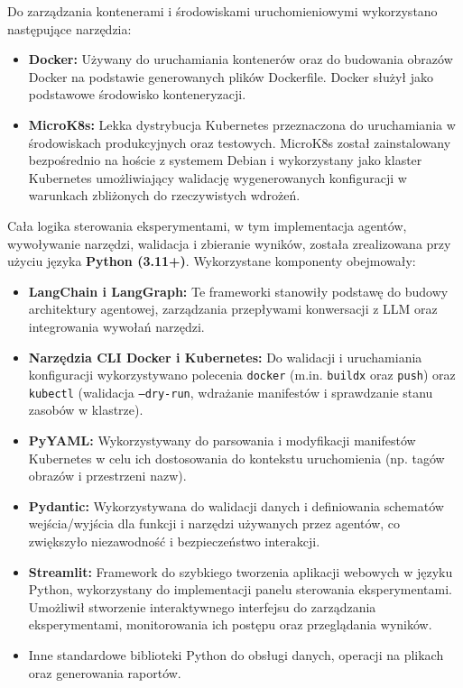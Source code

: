 Do zarządzania kontenerami i środowiskami uruchomieniowymi wykorzystano następujące narzędzia:
\begin{itemize}
	\item \textbf{Docker:} \cite{merkel_docker_nodate} Używany do uruchamiania kontenerów oraz do budowania obrazów Docker na podstawie generowanych plików Dockerfile. Docker służył jako podstawowe środowisko konteneryzacji.
	\item \textbf{MicroK8s:} \cite{microk8s} Lekka dystrybucja Kubernetes przeznaczona do uruchamiania w środowiskach produkcyjnych oraz testowych. MicroK8s został zainstalowany bezpośrednio na hoście z systemem Debian i wykorzystany jako klaster Kubernetes umożliwiający walidację wygenerowanych konfiguracji w warunkach zbliżonych do rzeczywistych wdrożeń.
\end{itemize}

Cała logika sterowania eksperymentami, w tym implementacja agentów, wywoływanie narzędzi, walidacja i zbieranie wyników, została zrealizowana przy użyciu języka \textbf{Python (3.11+)}. Wykorzystane komponenty obejmowały:
\begin{itemize}
    \item \textbf{LangChain i LangGraph:} \cite{langchain} \cite{langgraph} Te frameworki stanowiły podstawę do budowy architektury agentowej, zarządzania przepływami konwersacji z LLM oraz integrowania wywołań narzędzi.
    \item \textbf{Narzędzia CLI Docker i Kubernetes:} Do walidacji i uruchamiania konfiguracji wykorzystywano polecenia \texttt{docker} (m.in. \texttt{buildx} oraz \texttt{push}) oraz \texttt{kubectl} (walidacja \texttt{--dry-run}, wdrażanie manifestów i sprawdzanie stanu zasobów w klastrze).
    \item \textbf{PyYAML:} Wykorzystywany do parsowania i modyfikacji manifestów Kubernetes w celu ich dostosowania do kontekstu uruchomienia (np. tagów obrazów i przestrzeni nazw).
    \item \textbf{Pydantic:} \cite{pydantic} Wykorzystywana do walidacji danych i definiowania schematów wejścia/wyjścia dla funkcji i narzędzi używanych przez agentów, co zwiększyło niezawodność i bezpieczeństwo interakcji.
    \item \textbf{Streamlit:} \cite{streamlit} Framework do szybkiego tworzenia aplikacji webowych w języku Python, wykorzystany do implementacji panelu sterowania eksperymentami. Umożliwił stworzenie interaktywnego interfejsu do zarządzania eksperymentami, monitorowania ich postępu oraz przeglądania wyników.
    \item Inne standardowe biblioteki Python do obsługi danych, operacji na plikach oraz generowania raportów.
\end{itemize}

